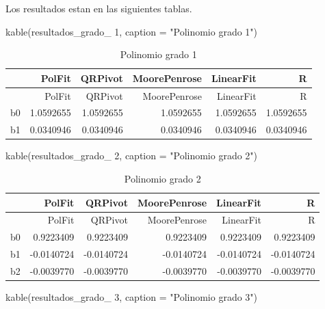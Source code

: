 \documentclass[
]{article}
\newenvironment{Shaded}{\begin{snugshade}}{\end{snugshade}}
\newcommand{\AttributeTok}[1]{\textcolor[rgb]{0.77,0.63,0.00}{#1}}
\newcommand{\FunctionTok}[1]{\textcolor[rgb]{0.00,0.00,0.00}{#1}}
\newcommand{\NormalTok}[1]{#1}
\newcommand{\StringTok}[1]{\textcolor[rgb]{0.31,0.60,0.02}{#1}}
\begin{document}
Los resultados estan en las siguientes tablas.

\begin{Shaded}
\begin{Highlighting}[]
\FunctionTok{kable}\NormalTok{(}\StringTok{\textasciigrave{}}\AttributeTok{resultados\_grado\_ 1}\StringTok{\textasciigrave{}}\NormalTok{, }\AttributeTok{caption =} \StringTok{"Polinomio grado 1"}\NormalTok{)}
\end{Highlighting}
\end{Shaded}

\begin{longtable}[]{@{}lrrrrr@{}}
\caption{Polinomio grado 1}\tabularnewline
\toprule
& PolFit & QRPivot & MoorePenrose & LinearFit & R \\
\midrule
\endfirsthead
\toprule
& PolFit & QRPivot & MoorePenrose & LinearFit & R \\
\midrule
\endhead
b0 & 1.0592655 & 1.0592655 & 1.0592655 & 1.0592655 & 1.0592655 \\
b1 & 0.0340946 & 0.0340946 & 0.0340946 & 0.0340946 & 0.0340946 \\
\bottomrule
\end{longtable}

\begin{Shaded}
\begin{Highlighting}[]
\FunctionTok{kable}\NormalTok{(}\StringTok{\textasciigrave{}}\AttributeTok{resultados\_grado\_ 2}\StringTok{\textasciigrave{}}\NormalTok{, }\AttributeTok{caption =} \StringTok{"Polinomio grado 2"}\NormalTok{)}
\end{Highlighting}
\end{Shaded}

\begin{longtable}[]{@{}lrrrrr@{}}
\caption{Polinomio grado 2}\tabularnewline
\toprule
& PolFit & QRPivot & MoorePenrose & LinearFit & R \\
\midrule
\endfirsthead
\toprule
& PolFit & QRPivot & MoorePenrose & LinearFit & R \\
\midrule
\endhead
b0 & 0.9223409 & 0.9223409 & 0.9223409 & 0.9223409 & 0.9223409 \\
b1 & -0.0140724 & -0.0140724 & -0.0140724 & -0.0140724 & -0.0140724 \\
b2 & -0.0039770 & -0.0039770 & -0.0039770 & -0.0039770 & -0.0039770 \\
\bottomrule
\end{longtable}

\begin{Shaded}
\begin{Highlighting}[]
\FunctionTok{kable}\NormalTok{(}\StringTok{\textasciigrave{}}\AttributeTok{resultados\_grado\_ 3}\StringTok{\textasciigrave{}}\NormalTok{, }\AttributeTok{caption =} \StringTok{"Polinomio grado 3"}\NormalTok{)}
\end{Highlighting}
\end{Shaded}
\end{document}
